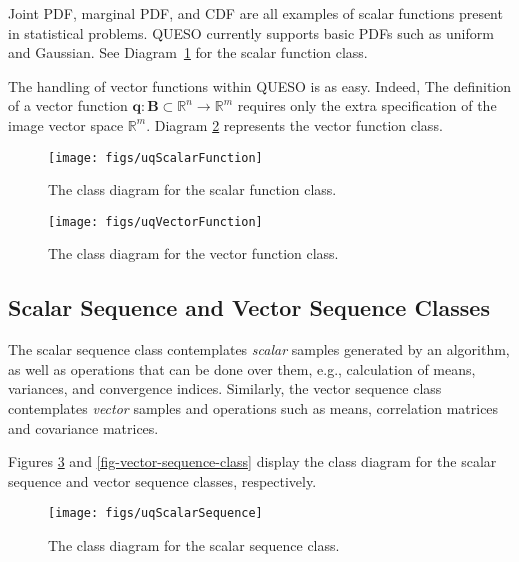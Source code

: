 Joint PDF, marginal PDF, and CDF are all examples of scalar functions present in statistical problems. 
QUESO currently supports basic PDFs such as uniform and Gaussian.
See Diagram~\ref{fig-scalar-function-class} for the scalar function class.

The handling of vector functions within QUESO is as easy. Indeed,
The definition of a vector function $\mathbf{q}:\mathbf{B}\subset\mathbb{R}^n\rightarrow\mathbb{R}^m$ requires only the extra specification of the image vector space $\mathbb{R}^m$. Diagram \ref{fig-vector-function-class} represents the vector function class.
\begin{figure}[htpb]
\centering
\texttt{[image: figs/uqScalarFunction]}
\vspace{-8pt}
\caption{The class diagram for the scalar function class.}
\label{fig-scalar-function-class}
\end{figure}

\begin{figure}[htpb]
\centering
\texttt{[image: figs/uqVectorFunction]}
\vspace{-8pt}
\caption{The class diagram for the vector function class.}
\label{fig-vector-function-class}
\end{figure}


\subsection{Scalar Sequence and Vector Sequence Classes}\label{sec:scalar-vector-sequence}
%
The scalar sequence class contemplates {\it scalar} samples generated by an algorithm, as well as operations that can
be done over them, e.g., calculation of means, variances, and convergence indices.
Similarly, the vector sequence class contemplates {\it vector} samples and operations such as means, correlation matrices and covariance matrices.

Figures \ref{fig-scalar-sequence-class} and \ref{fig-vector-sequence-class} display the class diagram for the scalar sequence  and vector sequence classes, respectively.

\begin{figure}[htpb]
\centering
\texttt{[image: figs/uqScalarSequence]}
\vspace{-8pt}
\caption{The class diagram for the scalar sequence class.}
\label{fig-scalar-sequence-class}
\end{figure}

